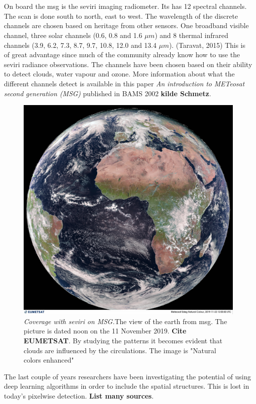 \\ \\ 
On board the \acrshort{msg} is the \acrfull{seviri} imaging radiometer. Its has  12 spectral channels. The scan is done south to north, east to west. The wavelength of the discrete channels are chosen based on heritage from other sensors. One broadband visible channel, three solar channels (0.6, 0.8 and 1.6 $\mu m$) and 8 thermal infrared channels (3.9, 6.2, 7.3, 8.7, 9.7, 10.8, 12.0 and 13.4 $\mu m$). (Taravat, 2015)  This is of great advantage since much of the community already know how to use the \acrshort{seviri} radiance observations. The channels have been chosen based on their ability to detect clouds, water vapour and ozone. More information about what the different channels detect is available in this paper \textit{An introduction to METeosat second generation (MSG)} published in BAMS 2002 \textbf{kilde Schmetz}. %
\begin{figure}[h]
    \centering
    \includegraphics[scale=0.11]{Chapter2_Theory/images/MET10_RGBNatColourEnhncd_FullResolution_20191123120000.jpg}    
    \caption{\textit{Coverage with \acrshort{seviri} on MSG.}The view of the earth from \acrshort{msg}. The picture is dated noon on the 11 November 2019. \textbf{Cite EUMETSAT}. By studying the patterns it becomes evident that clouds are influenced by the circulations. The image is "Natural colors enhanced"}
    \label{fig:sat_view}
\end{figure}
The last couple of years researchers have been investigating the potential of using deep learning algorithms in order to include the spatial structures. This is lost in today's pixelwise detection. \textbf{List many sources}.
